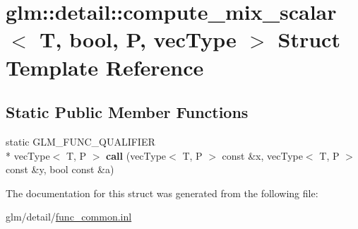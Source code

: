 \hypertarget{structglm_1_1detail_1_1compute__mix__scalar_3_01T_00_01bool_00_01P_00_01vecType_01_4}{\section{glm\-:\-:detail\-:\-:compute\-\_\-mix\-\_\-scalar$<$ T, bool, P, vec\-Type $>$ Struct Template Reference}
\label{structglm_1_1detail_1_1compute__mix__scalar_3_01T_00_01bool_00_01P_00_01vecType_01_4}
}
\subsection*{Static Public Member Functions}
\begin{DoxyCompactItemize}
\item 
\hypertarget{structglm_1_1detail_1_1compute__mix__scalar_3_01T_00_01bool_00_01P_00_01vecType_01_4_a32b46dd2110b41d9c7b98fc90b9a88b1}{static G\-L\-M\-\_\-\-F\-U\-N\-C\-\_\-\-Q\-U\-A\-L\-I\-F\-I\-E\-R \\*
vec\-Type$<$ T, P $>$ {\bfseries call} (vec\-Type$<$ T, P $>$ const \&x, vec\-Type$<$ T, P $>$ const \&y, bool const \&a)}\label{structglm_1_1detail_1_1compute__mix__scalar_3_01T_00_01bool_00_01P_00_01vecType_01_4_a32b46dd2110b41d9c7b98fc90b9a88b1}

\end{DoxyCompactItemize}


The documentation for this struct was generated from the following file\-:\begin{DoxyCompactItemize}
\item 
glm/detail/\hyperlink{func__common_8inl}{func\-\_\-common.\-inl}\end{DoxyCompactItemize}
